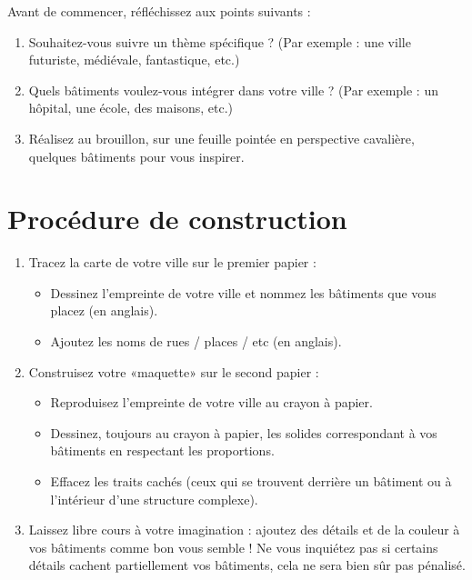 Avant de commencer, réfléchissez aux points suivants :
\begin{enumerate}
    \item Souhaitez-vous suivre un thème spécifique ? 
    (Par exemple : une ville futuriste, médiévale, fantastique, etc.)
    \item Quels bâtiments voulez-vous intégrer dans votre ville ? 
    (Par exemple : un hôpital, une école, des maisons, etc.)
    \item Réalisez au brouillon, sur une feuille pointée en perspective cavalière, quelques bâtiments pour vous inspirer.
\end{enumerate}

\vspace{-0.5cm}
\section*{Procédure de construction}
\vspace{-0.75cm}

\begin{enumerate}
    \item Tracez la carte de votre ville sur le premier papier :
    
    \begin{itemize}
        \item Dessinez l'empreinte de votre ville et nommez les bâtiments que vous placez (en anglais).
        \item Ajoutez les noms de rues / places / etc (en anglais).
    \end{itemize}
    \item Construisez votre «maquette» sur le second papier :
    
    \begin{itemize}
        \item Reproduisez l'empreinte de votre ville au crayon à papier.
        \item Dessinez, toujours au crayon à papier, les solides correspondant à vos bâtiments en respectant les proportions.
        \item Effacez les traits cachés (ceux qui se trouvent derrière un bâtiment ou à l'intérieur d'une structure complexe).
    \end{itemize}
    \item Laissez libre cours à votre imagination : ajoutez des détails et de la couleur à vos bâtiments comme bon vous semble ! 
    Ne vous inquiétez pas si certains détails cachent partiellement vos bâtiments, cela ne sera bien sûr pas pénalisé.
\end{enumerate}
